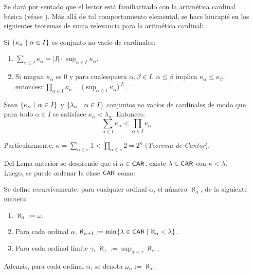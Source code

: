     Se dará por sentado que el lector está familiarizado con la aritmética cardinal básica (véase \cite[Cap.~1, \S ~ 3]{jechSet}). Más allá de tal comportamiento elemental, se hace hincapié en los siguientes teoremas de suma relevancia para la aritmética cardinal:
    \begin{teorema}
        Si $\{\kappa_\alpha \text{ $|$ } \alpha \in I\}$ es conjunto no vacío de cardinales:
        \begin{enumerate}
            \item $\displaystyle \sum_{\alpha \in I} \kappa_\alpha = |I| \cdot \sup_{\alpha \in I} \kappa_\alpha$.
            \item Si ningun $\kappa_\alpha$ es $0$ y para cualesquiera $\alpha,\beta \in I$, $\alpha \leq \beta$ implica $\kappa_\alpha \leq \kappa_\beta$, entonces: $\displaystyle \prod_{\alpha \in I} \kappa_\alpha = \Big( \sup_{\alpha \in I} \kappa_\alpha \Big)^{|I|}$.
        \end{enumerate}
    \end{teorema}

    \begin{teorema}
        Sean $\{\kappa_\alpha \text{ $|$ } \alpha \in I\}$ y $\{\lambda_\alpha \text{ $|$ } \alpha \in I\}$ conjuntos no vacíos de cardinales de modo que para todo $\alpha \in I$ se satisface $\kappa_\alpha < \lambda_\alpha$. Entonces:
        \[ \sum_{\alpha \in I} \kappa_\alpha < \prod_{\alpha \in I} \kappa_\alpha \]

        Particularmente, $\kappa = \sum_{\alpha \in \kappa} 1 < \prod_{\alpha \in \kappa} 2 = 2^\kappa$ (\textit{Teorema de Cantor}).
    \end{teorema}

    Del Lema anterior se desprende que si $\kappa \in \text{\textsf{\small CAR}}$, existe $\lambda \in \text{\textsf{\small CAR}}$ con $\kappa < \lambda$. Luego, se puede ordenar la clase $\text{\textsf{\small CAR}}$ como:
    \begin{definicion}\index[sym]{$\aleph_\alpha$}\index[sym]{$\omega_\alpha$}
        Se define recursivamente; para cualquier ordinal $\alpha$, el número $\aleph_\alpha$, de la siguiente manera:
        \begin{enumerate}
            \item $\aleph_0:=\omega$.
            \item Para cada ordinal $\alpha$, $\aleph_{\alpha+1}:=\min\{ \lambda \in \text{\textsf{\small CAR}} \text{ $|$ } \aleph_\alpha < \lambda \}$.
            \item Para cada ordinal límite $\gamma$, $\aleph_\gamma:=\sup_{\alpha < \gamma} \aleph_\alpha$.
        \end{enumerate}

        Además, para cada ordinal $\alpha$, se denota $\omega_\alpha:=\aleph_\alpha$.
    \end{definicion}
    
